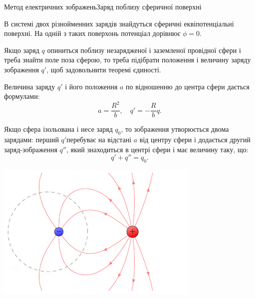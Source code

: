 \documentclass{beamer}
\begin{document}
\begin{frame}{Метод електричних зображень}{Заряд поблизу сферичної поверхні}
	\begin{overprint}
		\begin{block}{}\justifying
			В системі двох різнойменних зарядів знайдуться сферичні еквіпотенціальні поверхні. На
			одній з таких поверхонь потенціал дорівнює $\phi = 0$.
		\end{block}
		\begin{block}{}\justifying
			Якщо заряд $q$ опиниться поблизу \alert{незарядженої} і \alert{заземленої провідної сфери} і
			треба знайти поле поза сферою, то треба підібрати положення і величину заряду зображення $q'$,
			щоб задовольнити теоремі єдиності.
		\end{block}
		\begin{block}{}\justifying
			Величина заряду $q'$ і його положення $a$ по відношенню до центра сфери дається формулами:
			\begin{equation*}
				a = \frac{R^2}{b}, \quad   q' = -\frac{R}{b}q.
			\end{equation*}
		\end{block}
		\begin{block}{}\justifying
			Якщо сфера \alert{ізольована} і \alert{несе заряд $q_0$}, то зображення утворюється
			двома зарядами: перший $q' $перебуває на відстані $a$ від центру сфери і додається
			другий заряд-зображення $q''$, який знаходиться в центрі сфери і має величину таку, що:
			\begin{equation*}
				q' + q'' = q_0.
			\end{equation*}
		\end{block}
	\end{overprint}
	\begin{overprint}
		\onslide<1>
		\begin{center}
			\includegraphics[page=1]{mirrorsphere}

\end{center}
\end{overprint}
\end{frame}
\end{document}
